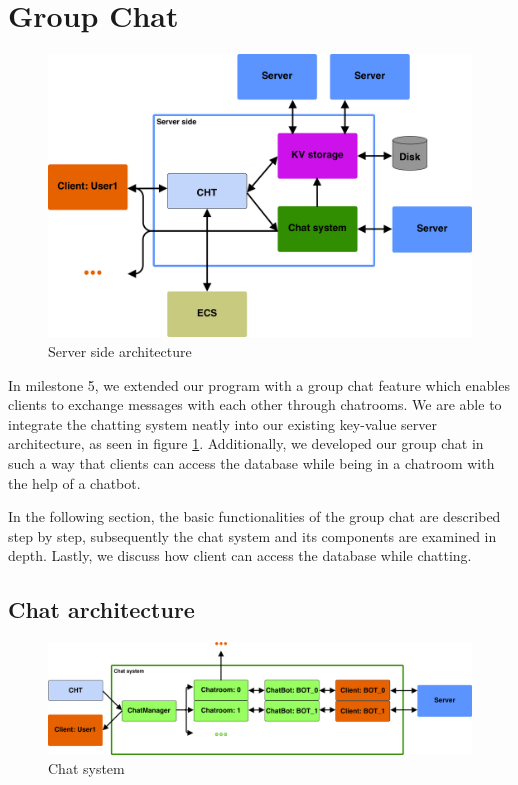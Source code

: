 \section{Group Chat}
\label{sec:groupchat}

\begin{figure}[h]
	\centering
	\includegraphics[width=\linewidth]{figures/chat/chat_full_arch.png}
	\caption{Server side architecture}
	\label{fig:chat_arch}
\end{figure}

In milestone 5, we extended our program with a group chat feature which enables clients to exchange messages with each other through chatrooms. We are able to integrate the chatting system neatly into our existing key-value server architecture, as seen in figure \ref{fig:chat_arch}. Additionally, we developed our group chat in such a way that clients can access the database while being in a chatroom with the help of a chatbot.
 
In the following section, the basic functionalities of the group chat are described step by step, subsequently the chat system and its components are examined in depth. Lastly, we discuss how client can access the database while chatting.

\subsection{Chat architecture}

\begin{figure}[h]
	\centering
	\includegraphics[width=\linewidth]{figures/chat/chat_arch.png}
	\caption{Chat system}
	\label{fig:chat_inside}
\end{figure}

